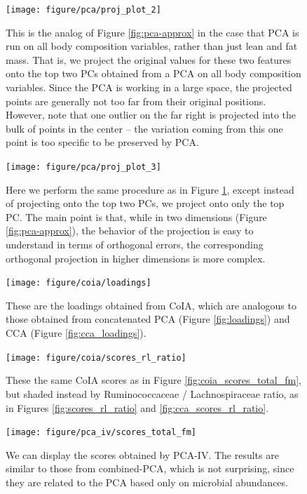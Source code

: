 \documentclass[14pt]{extarticle}
\begin{document}
\begin{figure}
  \texttt{[image: figure/pca/proj\_plot\_2]}
  \caption{This is the analog of Figure \ref{fig:pca-approx} in the case that
    PCA is run on all body composition variables, rather than just lean and
    fat mass. That is, we project the original values for these two features
    onto the top two PCs obtained from a PCA on all body composition variables.
    Since the PCA is working in a large space, the projected points are
    generally not too far from their original positions. However, note that one
    outlier on the far right is projected into the bulk of points in the center
    -- the variation coming from this one point is too specific to be preserved
    by PCA.
  \label{fig:pca-approx-2}}
\end{figure}

\begin{figure}
  \texttt{[image: figure/pca/proj\_plot\_3]}
  \caption{Here we perform the same procedure as in Figure
    \ref{fig:pca-approx-2}, except instead of projecting onto the top two PCs,
    we project onto only the top PC. The main point is that, while in two
    dimensions (Figure \ref{fig:pca-approx}), the behavior of the projection is
    easy to understand in terms of orthogonal errors, the corresponding
    orthogonal projection in higher dimensions is more complex.
  \label{fig:pca-approx-3}}
\end{figure}

\begin{figure}
  \centering \texttt{[image: figure/coia/loadings]}
  \caption{These are the loadings obtained from CoIA, which are analogous to
    those obtained from concatenated PCA (Figure \ref{fig:loadings}) and CCA
    (Figure \ref{fig:cca_loadings}). \label{fig:coia_loadings} }
\end{figure}

\begin{figure}
  \centering
  \texttt{[image: figure/coia/scores\_rl\_ratio]}
  \caption{These the same CoIA scores as in Figure \ref{fig:coia_scores_total_fm},
    but shaded instead by Ruminococcaceae / Lachnospiraceae ratio, as in Figures
    \ref{fig:scores_rl_ratio} and
    \ref{fig:cca_scores_rl_ratio}. \label{fig:coia_scores_rl_ratio} }
\end{figure}

\begin{figure}
  \centering
  \texttt{[image: figure/pca\_iv/scores\_total\_fm]}
  \caption{We can display the scores obtained by PCA-IV. The results are similar
    to those from combined-PCA, which is not surprising, since they are related
    to the PCA based only on microbial
    abundances. \label{fig:pca_iv_scores_total_fm} }
\end{figure}
\end{document}
